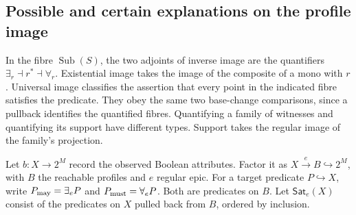 \documentclass[11pt,a4paper]{article}
\theoremstyle{definition}
\theoremstyle{remark}\newaliascnt{remark}{theorem}
\numberwithin{equation}{section}
\begin{document}
\subsection{Possible and certain explanations on the profile image}
In the fibre \(\operatorname{Sub}(S)\), the two adjoints of inverse image are the quantifiers \(\exists_r\dashv r^*\dashv\forall_r\). Existential image takes the image of the composite of a mono with \(r\). Universal image classifies the assertion that every point in the indicated fibre satisfies the predicate. They obey the same two base-change comparisons, since a pullback identifies the quantified fibres. Quantifying a family of witnesses and quantifying its support have different types. Support takes the regular image of the family's projection.

Let \(b:X\to 2^M\) record the observed Boolean attributes. Factor it as \(X\xrightarrow{e}B\hookrightarrow 2^M\), with \(B\) the reachable profiles and \(e\) regular epic. For a target predicate \(P\hookrightarrow X\), write \(P_{\rm may}=\exists_eP\) and \(P_{\rm must}=\forall_eP\). Both are predicates on \(B\). Let \(\mathsf{Sat}_e(X)\) consist of the predicates on \(X\) pulled back from \(B\), ordered by inclusion.
\end{document}
